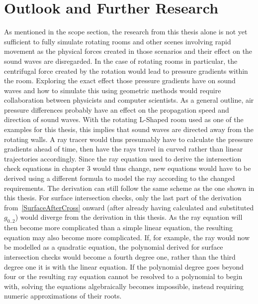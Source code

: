 \chapter{Outlook and Further Research}\label{ch:Outlook}

As mentioned in the scope section,
the research from this thesis alone is not yet sufficient to fully simulate rotating rooms
and other scenes involving rapid movement
as the physical forces created in those scenarios and their effect on the sound waves are disregarded.
\newline
In the case of rotating rooms in particular,
the centrifugal force created by the rotation would lead to pressure gradients within the room.
Exploring the exact effect those pressure gradients have on sound waves
and how to simulate this using geometric methods would require collaboration between physicists and computer scientists.
\newline
As a general outline, air pressure differences probably have an effect on the propagation speed and direction of sound waves.
With the rotating L-Shaped room used as one of the examples for this thesis,
this implies that sound waves are directed away from the rotating walls.
A ray tracer would thus presumably have to calculate the pressure gradients ahead of time,
then have the rays travel in curved rather than linear trajectories accordingly.
\newline
Since the ray equation used to derive the intersection check equations in chapter 3 would thus change,
new equations would have to be derived using a different formula to model the ray according to the changed requirements.
The derivation can still follow the same scheme as the one shown in this thesis.
For surface intersection checks, only the last part of the derivation from~\eqref{SurfaceAfterCross} onward
(after already having calculated and substituted \(g_{0..2}\)) would diverge from the derivation in this thesis.
\newline
As the ray equation will then become more complicated than a simple linear equation,
the resulting equation may also become more complicated.
If, for example, the ray would now be modelled as a quadratic equation,
the polynomial derived for surface intersection checks would become a fourth degree one,
rather than the third degree one it is with the linear equation.
If the polynomial degree goes beyond four
or the resulting ray equation cannot be resolved to a polynomial to begin with,
solving the equations algebraically becomes impossible,
instead requiring numeric approximations of their roots.
